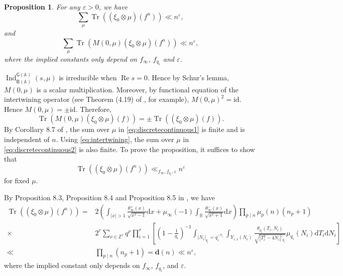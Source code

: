 \documentclass[10pt,oneside,reqno]{amsart}
\makeatletter
\newcommand\rmd{\mathrm{d}}
\renewcommand\AA{\mathbb{A}}
\newcommand\RR{\mathbb{R}}
\newcommand\ZZ{\mathbb{Z}}
\newcommand\B{\mathsf{B}}
\newcommand\G{\mathsf{G}}
\renewcommand\Re{\mathop{\mathrm{Re}}}
\DeclareMathOperator\Tr{Tr}
\DeclareMathOperator\Ind{Ind}
\newcommand\id{\mathrm{id}}
\theoremstyle{THEOREM}
\newtheorem{proposition}[theorem]{Proposition}
\theoremstyle{DEFINITION}
\theoremstyle{EXERCISE}
\numberwithin{equation}{section}
\renewenvironment{proof}[1][\proofname]{\par
  \vspace{-6pt}
  \pushQED{\qed}
  \normalfont \topsep6\p@\@plus6\p@\relax
  \trivlist
  \item[\hskip\labelsep\rmfamily\bfseries
    #1\@addpunct{:}]\ignorespaces
}{
  \popQED\endtrivlist\@endpefalse
  \vspace{-6pt}
}
\makeatother
\begin{document}
\begin{proposition}\label{prop:eisensteinestimate}
For any $\varepsilon>0$, we have
\begin{equation}\label{eq:discretecontinuous1}
\sum_{\mu}\Tr((\xi_0\otimes\mu)(f^n))\ll n^\varepsilon,
\end{equation}
and
\begin{equation}\label{eq:discretecontinuous2}
\sum_{\mu}\Tr(M(0,\mu)(\xi_0\otimes\mu)(f^n))\ll n^\varepsilon,
\end{equation}
where the implied constants only depend on $f_\infty$, $f_{q_i}$ and $\varepsilon$.
\end{proposition}
\begin{proof}
$\Ind_{\B(\AA)}^{\G(\AA)}(s,\mu)$ is irreducible when $\Re s=0$. Hence by Schur's lemma, $M(0,\mu)$ is a scalar multiplication. Moreover, by functional equation of the intertwining operator (see Theorem (4.19) of \cite{gelbart1979}, for example), $M(0,\mu)^2=\id$. Hence $M(0,\mu)=\pm\id$. Therefore, 
\begin{equation}\label{eq:intertwining}
\Tr(M(0,\mu)(\xi_0\otimes\mu)(f))=\pm\Tr((\xi_0\otimes\mu)(f)).
\end{equation}
By Corollary 8.7 of \cite{cheng2025}, the sum over $\mu$ in \eqref{eq:discretecontinuous1} is finite and is independent of $n$. Using \eqref{eq:intertwining}, the sum over $\mu$ in \eqref{eq:discretecontinuous2} is also finite. To prove the proposition, it suffices to show that 
\[
\Tr((\xi_0\otimes\mu)(f^n))\ll_{f_{\infty},f_{q_i},\varepsilon} n^\varepsilon
\]
for fixed $\mu$.

By Proposition 8.3, Proposition 8.4 and Proposition 8.5 in \cite{cheng2025}, we have
\begin{align*}
    \Tr((\xi_0\otimes\mu)(f^n))
    = &2\left(\int_{|x|>1}\frac{\theta_\infty^+(x)}{\sqrt{x^2-1}}\rmd x+\mu_{\infty}(-1)\int_{\RR}\frac{\theta_\infty^-(x)}{\sqrt{x^2+1}}\rmd x\right)\prod_{p\mid n}\mu_p(n)(n_p+1)\\
    \times & 2^r\sum_{\nu\in \ZZ^r}q^{\nu}\prod_{i=1}^{r}\left[\left(1-\frac{1}{q_i}\right)^{-1} \int_{|N_i|_{q_i}= q_i^{-\nu_i}}\int_{Y_{i,1}(N_i)} \frac{\theta_{q_i}(T_i,N_i)}{\sqrt{|T_i^2-4N_i|'_{q_i}}}\mu_{q_i}(N_i)\rmd T_i\rmd N_i\right]\\
    \ll &\prod_{p\mid n}(n_p+1)=\bm{d}(n)\ll n^\varepsilon,
\end{align*}
where the implied constant only depends on $f_{\infty}$, $f_{q_i}$, and $\varepsilon$.
\end{proof}
\end{document}

